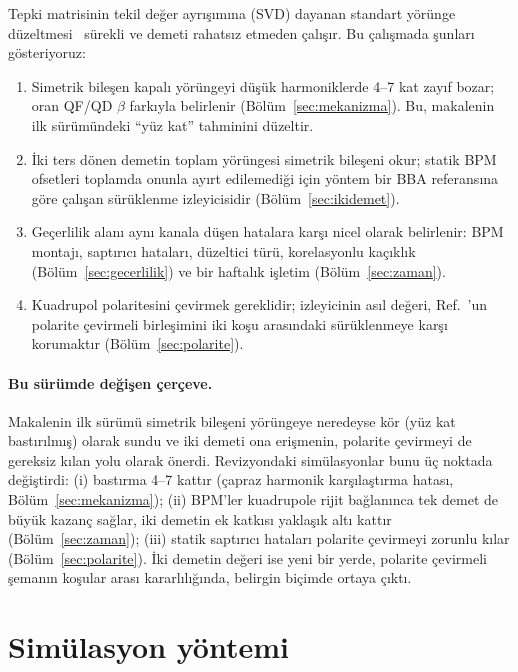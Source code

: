 \documentclass[12pt,a4paper]{extarticle}
\begin{document}
Tepki matrisinin tekil değer ayrışımına (SVD) dayanan standart yörünge düzeltmesi~\cite{chung1993,ziemann,mirza,wegscheider}
sürekli ve demeti rahatsız etmeden çalışır. Bu çalışmada şunları gösteriyoruz:
\begin{enumerate}[nosep]
\item Simetrik bileşen kapalı yörüngeyi düşük harmoniklerde 4--7 kat zayıf bozar; oran QF/QD $\beta$ farkıyla
belirlenir (Bölüm~\ref{sec:mekanizma}). Bu, makalenin ilk sürümündeki ``yüz kat'' tahminini düzeltir.
\item İki ters dönen demetin toplam yörüngesi simetrik bileşeni okur; statik BPM ofsetleri toplamda onunla ayırt
edilemediği için yöntem bir BBA referansına göre çalışan sürüklenme izleyicisidir (Bölüm~\ref{sec:ikidemet}).
\item Geçerlilik alanı aynı kanala düşen hatalara karşı nicel olarak belirlenir: BPM montajı, saptırıcı
hataları, düzeltici türü, korelasyonlu kaçıklık (Bölüm~\ref{sec:gecerlilik}) ve bir haftalık işletim
(Bölüm~\ref{sec:zaman}).
\item Kuadrupol polaritesini çevirmek gereklidir; izleyicinin asıl değeri, Ref.~\cite{omarov}'un polarite
çevirmeli birleşimini iki koşu arasındaki sürüklenmeye karşı korumaktır (Bölüm~\ref{sec:polarite}).
\end{enumerate}

\paragraph{Bu sürümde değişen çerçeve.} Makalenin ilk sürümü simetrik bileşeni yörüngeye neredeyse kör
(yüz kat bastırılmış) olarak sundu ve iki demeti ona erişmenin, polarite çevirmeyi de gereksiz kılan yolu
olarak önerdi. Revizyondaki simülasyonlar bunu üç noktada değiştirdi: (i) bastırma 4--7 kattır (çapraz
harmonik karşılaştırma hatası, Bölüm~\ref{sec:mekanizma}); (ii) BPM'ler kuadrupole rijit bağlanınca tek demet de
büyük kazanç sağlar, iki demetin ek katkısı yaklaşık altı kattır (Bölüm~\ref{sec:zaman}); (iii) statik
saptırıcı hataları polarite çevirmeyi zorunlu kılar (Bölüm~\ref{sec:polarite}). İki demetin değeri ise yeni bir
yerde, polarite çevirmeli şemanın koşular arası kararlılığında, belirgin biçimde ortaya çıktı.

\section{Simülasyon yöntemi}
\end{document}
